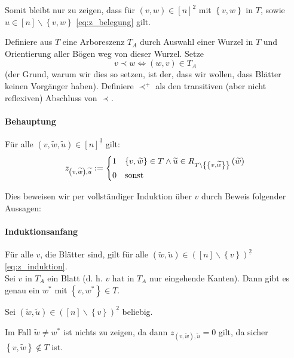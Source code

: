 \documentclass[10p,a4paper,BCOR = 12mm, DIV=15]{scrbook}
\begin{document}
{\begin{bew}
Somit bleibt nur zu zeigen, dass für $\left(v, w\right) \in \left[n\right]^{\underline{2}}$ mit $\left\{v, w\right\}$ in $T$, sowie $u \in \left[n\right] \backslash \left\{v, w\right\}$ \eqref{eq:z_belegung} gilt.

Definiere aus $T$ eine Arboreszenz $T_A$ durch Auswahl einer Wurzel in $T$ und Orientierung aller Bögen weg von dieser Wurzel. Setze
\begin{displaymath}
v\prec w \Leftrightarrow (w, v) \in T_A
\end{displaymath}
(der Grund, warum wir dies so setzen, ist der, dass wir wollen, dass Blätter keinen Vorgänger haben). Definiere $\prec^+$ als den transitiven (aber nicht reflexiven) Abschluss von $\prec$.

\paragraph{Behauptung} Für alle $\left(v, \widetilde{w}, \widetilde{u}\right)\in \left[n\right]^{\underline{3}}$ gilt:
\begin{align}
z_{\left(v, \widetilde{w}\right), \widetilde{u}} := \begin{cases}
1 & \left\{v, \widetilde{w}\right\}\in T\wedge \widetilde{u}\in R_{T\backslash \left\{\left\{v, \widetilde{w}\right\}\right\}}\left(\widetilde{w}\right)\\
0 & \textnormal{sonst}
\end{cases}
\label{eq:z_induktion}
\end{align}

Dies beweisen wir per vollständiger Induktion über $v$ durch Beweis folgender Aussagen:

\paragraph{Induktionsanfang} Für alle $v$, die Blätter sind, gilt  für alle $\left(\widetilde{w}, \widetilde{u}\right)\in \left(\left[n\right]\backslash \left\{v\right\}\right)^{\underline{2}}$ \eqref{eq:z_induktion}. \\

Sei $v$ in $T_A$ ein Blatt (d. h. $v$ hat in $T_A$ nur eingehende Kanten). Dann gibt es genau ein $w^*$ mit $\left\{v, w^*\right\}\in T$.

Sei $\left(\widetilde{w}, \widetilde{u}\right)\in \left(\left[n\right]\backslash \left\{v\right\}\right)^{\underline{2}}$ beliebig.

Im Fall $\widetilde{w}\neq w^*$ ist nichts zu zeigen, da dann $z_{\left(v, \widetilde{w}\right), \widetilde{u}} = 0$ gilt, da sicher $\left\{v, \widetilde{w}\right\}\notin T$ ist.


\end{bew}}
\end{document}
